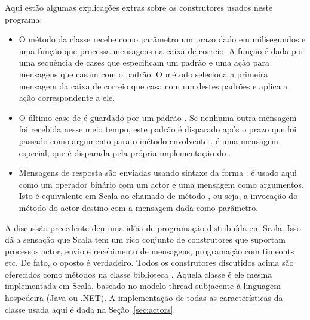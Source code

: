 Aqui est\~{a}o algumas explica\c{c}\~{o}es extras sobre os construtores usados neste programa:
\begin{itemize}
\item
O m\'{e}todo  da classe  recebe como par\^{a}metro um prazo dado
em milisegundos e uma fun\c{c}\~{a}o que processa mensagens na caixa de correio. A fun\c{c}\~{a}o \'{e} dada
por uma sequ\^{e}ncia de cases que especificam um padr\~{a}o e uma a\c{c}\~{a}o para mensagens que 
casam com o padr\~{a}o. O m\'{e}todo  seleciona a primeira mensagem da 
caixa de correio que casa com um destes padr\~{o}es e aplica a a\c{c}\~{a}o correspondente a ele. 


\item
O \'{u}ltimo case de  \'{e} guardado por um padr\~{a}o .  
Se nenhuma outra mensagem foi recebida nesse meio tempo, este padr\~{a}o \'{e} disparado
ap\'{o}s o prazo que foi passado como argumento para o m\'{e}todo envolvente .
 \'{e} uma mensagem especial, que \'{e} disparada pela pr\'{o}pria implementa\c{c}\~{a}o do 
.    

\item
Mensagens de resposta s\~{a}o enviadas usando sintaxe da forma .
\code{!} \'{e} usado aqui como um operador bin\'{a}rio com um actor e uma mensagem como argumentos.
Isto \'{e} equivalente em Scala ao chamado de m\'{e}todo , ou seja, 
a invoca\c{c}\~{a}o do m\'{e}todo \code{!} do actor destino com a mensagem dada como par\^{a}metro.
\end{itemize}    

A discuss\~{a}o precedente deu uma id\'{e}ia de programa\c{c}\~{a}o distribu\'{i}da em Scala. Isso
d\'{a} a sensa\c{c}\~{a}o que Scala tem um rico conjunto de construtores que suportam
processos actor, envio e recebimento de mensagens, programa\c{c}\~{a}o com timeouts etc.
De fato, o oposto \'{e} verdadeiro. Todos os construtores discutidos acima s\~{a}o 
oferecidos como m\'{e}todos na classe biblioteca . Aquela classe \'{e}
ele mesma implementada em Scala, baseado no modelo thread subjacente à linguagem 
hospedeira (Java ou .NET). A implementa\c{c}\~{a}o de todas as caracter\'{i}sticas da 
classe  usada aqui \'{e} dada na Se\c{c}\~{a}o~\ref{sec:actors}.     

